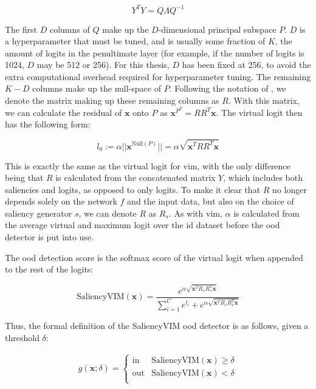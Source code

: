 \documentclass[UKenglish]{uiomasterthesis} %
\theoremstyle{definition}
\begin{document}
\begin{equation}
    Y^TY = Q\Lambda Q^{-1}
\end{equation}

\noindent The first $D$ columns of $Q$ make up the $D$-dimensional principal subspace $P$. $D$ is a hyperparameter that must be tuned, and is usually some fraction of $K$, the amount of logits in the penultimate layer (for example, if the number of logits is 1024, $D$ may be 512 or 256). For this thesis, $D$ has been fixed at 256, to avoid the extra computational overhead required for hyperparameter tuning. The remaining $K - D$ columns make up the null-space of $P$. Following the notation of \cite{vim}, we denote the matrix making up these remaining columns as $R$. With this matrix, we can calculate the residual of $\bm{x}$ onto $P$ as $\bm{x}^{P^T} = RR^T\bm{x}$. The virtual logit then has the following form:

\begin{equation}
l_0 := \alpha || \bm{x}^{\text{Null}(P)}|| = \alpha \sqrt{\bm{x}^T RR^T\bm{x}}
\end{equation}

\noindent This is exactly the same as the virtual logit for \ac{vim}, with the only difference being that $R$ is calculated from the concatenated matrix $Y$, which includes both saliencies and logits, as opposed to only logits. To make it clear that $R$ no longer depends solely on the network $f$ and the input data, but also on the choice of saliency generator $s$, we can denote $R$ as $R_s$. As with \ac{vim}, $\alpha$ is calculated from the average virtual and maximum logit over the \ac{id} dataset before the \ac{ood} detector is put into use.

The \ac{ood} detection score is the softmax score of the virtual logit when appended to the rest of the logits:

\begin{equation}
\text{SaliencyVIM}(\bm{x}) = \frac{e^{\alpha\sqrt{\bm{x}^TR_sR_s^T\bm{x}}}}{\sum_{i=1}^C e^{l_i} + e^{\alpha\sqrt{\bm{x}^TR_sR_s^T\bm{x}}}}
\end{equation}

\noindent Thus, the formal definition of the SaliencyVIM \ac{ood} detector is as follows, given a threshold $\delta$:

\begin{align}
    g(\bm{x}; \delta)=\begin{cases} 
        \text{in } & \text{SaliencyVIM}(\bm{x}) \ge \delta \\[10pt]
        \text{out} & \text{SaliencyVIM}(\bm{x}) < \delta \\[10pt]
   \end{cases}
\label{eq:aggregate}
\end{align}
\end{document}
